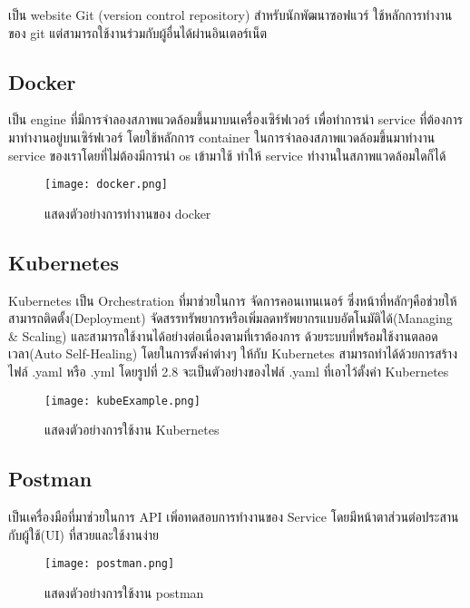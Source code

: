 เป็น website Git (version control repository) สำหรับนักพัฒนาซอฟแวร์ ใช้หลักการทำงานของ git แต่สามารถใช้งานร่วมกับผู้อื่นได้ผ่านอินเตอร์เน็ต

\subsection{Docker}

เป็น engine ที่มีการจำลองสภาพแวดล้อมขึ้นมาบนเครื่องเซิร์ฟเวอร์ เพื่อทำการนำ service ที่ต้องการมาทำงานอยู่บนเซิร์ฟเวอร์ โดยใช้หลักการ container ในการจำลองสภาพแวดล้อมขึ้นมาทำงาน service ของเราโดยที่ไม่ต้องมีการนำ os เข้ามาใช้ ทำให้ service ทำงานในสภาพแวดล้อมใดก็ได้~\cite{container}

\begin{figure}[H]
  \centering
  \texttt{[image: docker.png]}
  \caption{แสดงตัวอย่างการทำงานของ docker}
  \label{Fig:docker}
\end{figure}

\subsection{Kubernetes}

Kubernetes เป็น Orchestration ที่มาช่วยในการ จัดการคอนเทนเนอร์ ซึ่งหน้าที่หลักๆคือช่วยให้สามารถติดตั้ง(Deployment) จัดสรรทรัพยากรหรือเพิ่มลดทรัพยากรแบบอัตโนมัติได้(Managing \& Scaling) และสามารถใช้งานได้อย่างต่อเนื่องตามที่เราต้องการ ด้วยระบบที่พร้อมใช้งานตลอดเวลา(Auto Self-Healing) โดยในการตั้งค่าต่างๆ ให้กับ Kubernetes สามารถทำได้ด้วยการสร้างไฟล์ .yaml หรือ .yml โดยรูปที่ 2.8 จะเป็นตัวอย่างของไฟล์ .yaml ที่เอาไว้ตั้งค่า Kubernetes \cite{kube}

\begin{figure}[H]
  \centering
  \texttt{[image: kubeExample.png]}
  \caption{แสดงตัวอย่างการใช้งาน Kubernetes}
  \label{Fig:kubernetes}
\end{figure}

\subsection{Postman}

เป็นเครื่องมือที่มาช่วยในการ API เพิ่อทดสอบการทำงานของ Service โดยมีหน้าตาส่วนต่อประสานกับผู้ใช้(UI) ที่สวยและใช้งานง่าย

\begin{figure}[H]
  \centering
  \texttt{[image: postman.png]}
  \caption{แสดงตัวอย่างการใช้งาน postman}
  \label{Fig:postman}
\end{figure}

